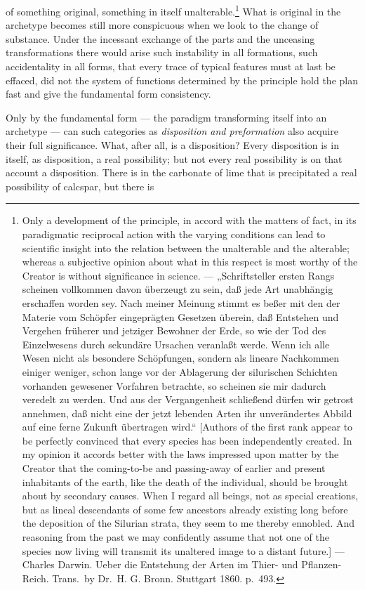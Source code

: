 \documentclass[12pt,a4paper]{book}
\begin{document}
\setcounter{footnote}{0}
of something original, something in itself unalterable.\footnote{Only a
development of the principle, in accord with the matters of fact, in its
paradigmatic reciprocal action with the varying conditions can lead to
scientific insight into the relation between the unalterable and the alterable;
whereas a subjective opinion about what in this respect is most worthy of the
Creator is without significance in science. ---
„Schriftsteller ersten Rangs scheinen vollkommen davon überzeugt zu sein,
daß jede Art unabhängig erschaffen worden sey. Nach meiner Meinung
stimmt es beßer mit den der Materie vom Schöpfer eingeprägten Gesetzen
überein, daß Entstehen und Vergehen früherer und jetziger Bewohner der
Erde, so wie der Tod des Einzelwesens durch sekundäre Ursachen veranlaßt
werde. Wenn ich alle Wesen nicht als besondere Schöpfungen, sondern als
lineare Nachkommen einiger weniger, schon lange vor der Ablagerung der
silurischen Schichten vorhanden gewesener Vorfahren betrachte, so
scheinen sie mir dadurch veredelt zu werden. Und aus der Vergangenheit
schließend dürfen wir getrost annehmen, daß nicht eine der jetzt
lebenden Arten ihr unverändertes Abbild auf eine ferne Zukunft übertragen
wird.“ [Authors of the first rank appear to be perfectly convinced that every
species has been independently created. In my opinion it accords better with
the laws impressed upon matter by the Creator that the coming-to-be and
passing-away of earlier and present inhabitants of the earth, like the death of
the individual, should be brought about by secondary causes. When I regard all
beings, not as special creations, but as lineal descendants of some few
ancestors already existing long before the deposition of the Silurian strata,
they seem to me thereby ennobled. And reasoning from the past we may confidently
assume that not one of the species now living will transmit its unaltered image
to a distant future.] --- Charles Darwin. Ueber die Entstehung der Arten im
Thier- und Pflanzen-Reich. Trans.\ by Dr.\ H. G. Bronn. Stuttgart 1860.
p.~493.}
What is original in the archetype becomes still more conspicuous when we look
to the change of substance. Under the incessant exchange of the parts and the
unceasing transformations there would arise such instability in all formations,
such accidentality in all forms, that every trace of typical features must at
last be effaced, did not the system of functions determined by the principle
hold the plan fast and give the fundamental form consistency.

Only by the fundamental form --- the paradigm transforming itself into an
archetype --- can such categories as \emph{disposition and preformation} also
acquire their full significance. What, after all, is a disposition? Every
disposition is in itself, as disposition, a real possibility; but not every
real possibility is on that account a disposition. There is in the carbonate of
lime that is precipitated a real possibility of calcspar, but there is
\end{document}
